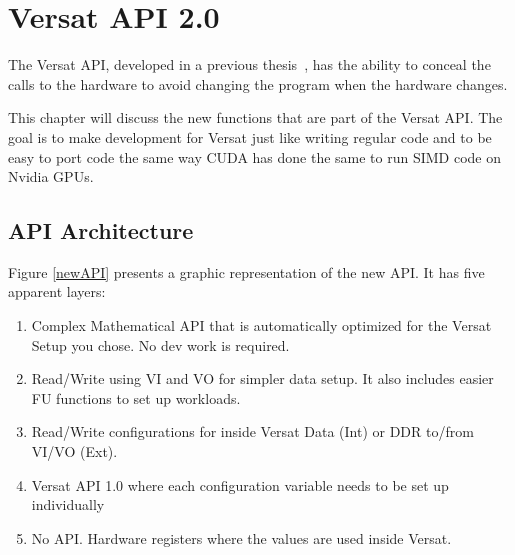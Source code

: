 \chapter{Versat API 2.0}
\label{chapter:API}

The Versat API, developed in a previous thesis~\cite{valter:deepversat}, has the ability to conceal
the calls to the hardware to avoid changing the program when the hardware changes. 

This chapter will discuss the new functions that are part of the Versat API. The goal
is to make development for Versat just like writing regular code and to be easy to port code the same way
CUDA has done the same to run SIMD code on Nvidia GPUs.



\section{API Architecture}

Figure \ref{newAPI} presents a graphic representation of the new API. It has five apparent layers:

\begin{enumerate}
	\item Complex Mathematical API that is automatically optimized for the Versat Setup you chose. No dev work is required.
	\item Read/Write using VI and VO for simpler data setup. It also includes easier FU functions to set up workloads.
	\item Read/Write configurations for inside Versat Data (Int) or DDR to/from VI/VO (Ext).
	\item Versat API 1.0 where each configuration variable needs to be set up individually
	\item No API. Hardware registers where the values are used inside Versat. 
  \end{enumerate}


